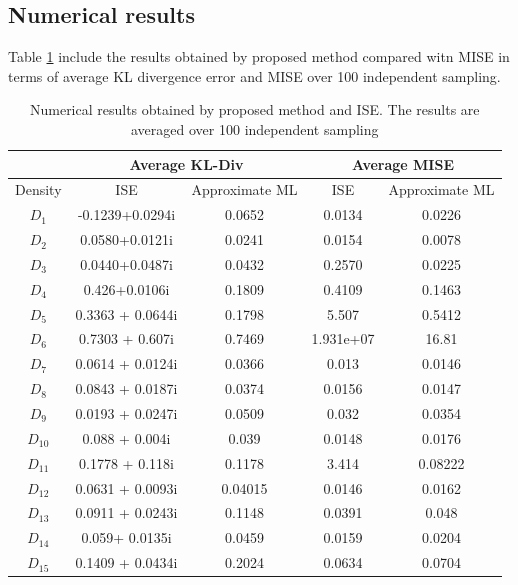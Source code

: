 \subsection{Numerical results}
Table \ref{tbl:NR} include the results obtained by proposed method compared witn MISE in terms of average KL divergence error and MISE over 100 independent sampling.
\begin{table}
\begin{tabular}{|c|c|c|c|c|}
&\multicolumn{2}{c|}{Average KL-Div } & \multicolumn{2}{c|}{Average MISE} 
\\\hline
Density & ISE&Approximate ML & ISE & Approximate ML
\\\hline
$D_1$& -0.1239+0.0294i&0.0652&0.0134&0.0226
\\\hline
$D_2$&0.0580+0.0121i&0.0241&0.0154&0.0078
\\\hline
$D_3$ & 0.0440+0.0487i&0.0432&0.2570&0.0225
\\\hline
$D_4$&0.426+0.0106i&0.1809&0.4109&0.1463
\\\hline
$D_5$&0.3363 + 0.0644i&0.1798&5.507&0.5412
\\\hline
$D_6$&0.7303 + 0.607i&0.7469&1.931e+07&16.81
\\\hline
$D_7$&0.0614 + 0.0124i&0.0366&0.013&0.0146
\\\hline
$D_8$&0.0843 + 0.0187i&0.0374&0.0156&0.0147
\\\hline
$D_9$&0.0193 + 0.0247i&0.0509&0.032&0.0354
\\\hline
$D_{10}$&0.088 + 0.004i&0.039&0.0148&0.0176
\\\hline
$D_{11}$&0.1778 + 0.118i&0.1178&3.414&0.08222
\\\hline
$D_{12}$&0.0631 + 0.0093i&0.04015&0.0146&0.0162
\\\hline
$D_{13}$&0.0911 + 0.0243i&0.1148&0.0391&0.048
\\\hline
$D_{14}$&0.059+ 0.0135i&0.0459&0.0159&0.0204
\\\hline
$D_{15}$&0.1409 + 0.0434i&0.2024&0.0634&0.0704
\\\hline
\end{tabular}
\caption{\label{tbl:NR} Numerical results obtained by proposed method and ISE. The results are averaged over 100 independent sampling}
\end{table}
